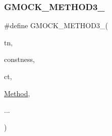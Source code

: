 \subsubsection{\texorpdfstring{G\+M\+O\+C\+K\+\_\+\+M\+E\+T\+H\+O\+D3\+\_\+}{GMOCK\_METHOD3\_}}
{\footnotesize\ttfamily \#define G\+M\+O\+C\+K\+\_\+\+M\+E\+T\+H\+O\+D3\+\_\+(\begin{DoxyParamCaption}\item[{}]{tn,  }\item[{}]{constness,  }\item[{}]{ct,  }\item[{}]{\hyperlink{gmock-spec-builders__test_8cc_a95606368148f3e5aab5db46c32466afd}{Method},  }\item[{}]{... }\end{DoxyParamCaption})}


